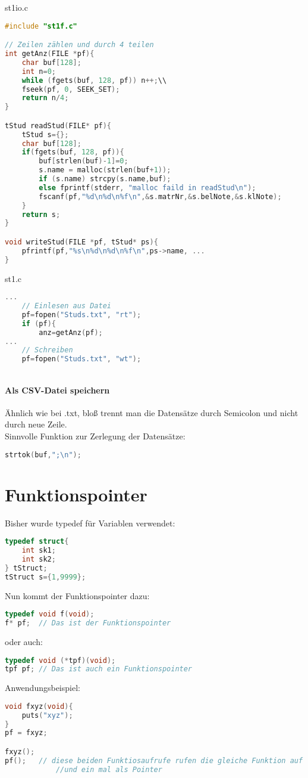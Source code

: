 st1io.c
\begin{lstlisting}[language=C]
#include "st1f.c"

// Zeilen zählen und durch 4 teilen
int getAnz(FILE *pf){
	char buf[128];
	int n=0;
	while (fgets(buf, 128, pf)) n++;\\
	fseek(pf, 0, SEEK_SET);
	return n/4;
}

tStud readStud(FILE* pf){
	tStud s={};
	char buf[128];
	if(fgets(buf, 128, pf)){
		buf[strlen(buf)-1]=0;
		s.name = malloc(strlen(buf+1));
		if (s.name) strcpy(s.name,buf);
		else fprintf(stderr, "malloc faild in readStud\n");
		fscanf(pf,"%d\n%d\n%f\n",&s.matrNr,&s.belNote,&s.klNote);
	}
	return s;
}

void writeStud(FILE *pf, tStud* ps){
	pfrintf(pf,"%s\n%d\n%d\n%f\n",ps->name, ...
}


\end{lstlisting}

st1.c
\begin{lstlisting}[language=C]
...
	// Einlesen aus Datei
	pf=fopen("Studs.txt", "rt");
	if (pf){
		anz=getAnz(pf);		
...
	// Schreiben
	pf=fopen("Studs.txt", "wt");
		
\end{lstlisting}

\paragraph{Als CSV-Datei speichern}

Ähnlich wie bei .txt, bloß trennt man die Datensätze durch Semicolon und nicht durch neue Zeile.\\
Sinnvolle Funktion zur Zerlegung der Datensätze: 
\begin{lstlisting}[language=C]
strtok(buf,";\n");
\end{lstlisting}

\section{Funktionspointer}

Bisher wurde typedef für Variablen verwendet:
\begin{lstlisting}[language=C]
typedef struct{
	int sk1;
	int sk2;
} tStruct;
tStruct s={1,9999};
\end{lstlisting}
Nun kommt der Funktionspointer dazu:
\begin{lstlisting}[language=C]
typedef void f(void);
f* pf;	// Das ist der Funktionspointer
\end{lstlisting}
oder auch:
\begin{lstlisting}[language=C]
typedef void (*tpf)(void);
tpf pf;	// Das ist auch ein Funktionspointer
\end{lstlisting}
Anwendungsbeispiel:
\begin{lstlisting}[language=C]
void fxyz(void){
	puts("xyz");
}
pf = fxyz;

fxyz();
pf();	// diese beiden Funktiosaufrufe rufen die gleiche Funktion auf - ein mal dirket 
			//und ein mal als Pointer
\end{lstlisting}
